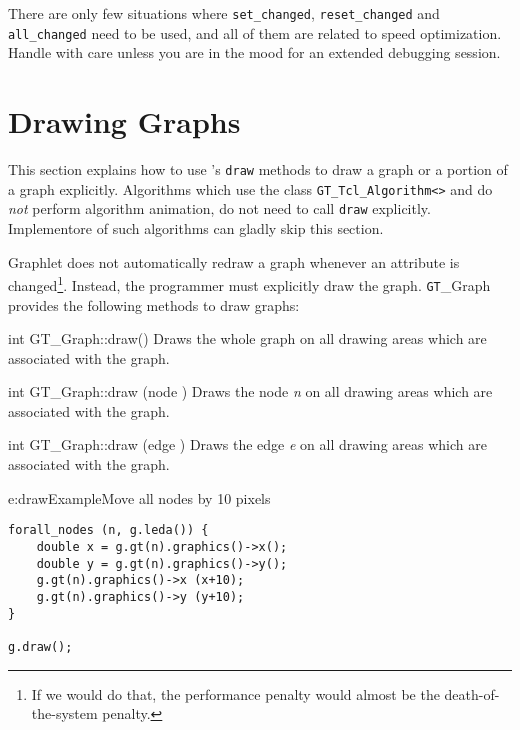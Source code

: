 \documentclass[twoside,fleqn]{report}
\begin{document}
\begin{notes}
  
  \item There are only few situations where
  \texttt{set\_changed}, \texttt{reset\_changed} and
  \texttt{all\_changed} need to be used, and all of them are
  related to speed optimization. Handle with care unless you are
  in the mood for an extended debugging session.

\end{notes}




%
%

\section{Drawing Graphs}


This section explains how to use 's \texttt{draw}
methods to draw a graph or a portion of a graph explicitly.
Algorithms which use the class \verb|GT_Tcl_Algorithm<>| and do
\emph{not} perform algorithm animation, do not need to call
\texttt{draw} explicitly. Implementore of such algorithms can
gladly skip this section.

Graphlet does not automatically redraw a graph whenever an
attribute is changed\footnote{If we would do that, the
  performance penalty would almost be the death-of-the-system
  penalty.}.  Instead, the programmer must explicitly draw the
graph.  \texttt{GT}\_Graph provides the following methods to draw
graphs:

\begin{Cdefinition}

  \item[int GT\_Graph::draw()]
  Draws the whole graph on all drawing areas which are associated with 
  the graph.

  \item[int GT\_Graph::draw (node \Param{n})]
  Draws the node \emph{n} on all drawing areas which are associated with 
  the graph.

  \item[int GT\_Graph::draw (edge \Param{e})]
  Draws the edge \emph{e} on all drawing areas which are associated with 
  the graph.

\end{Cdefinition}

\begin{example}{e:drawExample}{Move all nodes by 10 pixels}
\begin{verbatim}
forall_nodes (n, g.leda()) {
    double x = g.gt(n).graphics()->x();
    double y = g.gt(n).graphics()->y();
    g.gt(n).graphics()->x (x+10);
    g.gt(n).graphics()->y (y+10);
}

g.draw(); 
\end{verbatim}
\end{example}
\end{document}
